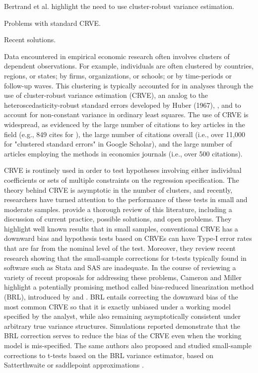 \documentclass[12pt]{article}\usepackage[]{graphicx}\usepackage[]{color}
\begin{document}
Bertrand et al. highlight the need to use cluster-robust variance estimation.

Problems with standard CRVE.

Recent solutions. 

Data encountered in empirical economic research often involves clusters of dependent observations. 
For example, individuals are often clustered by countries, regions, or states; by firms, organizations, or schools; or by time-periods or follow-up waves. 
This clustering is typically accounted for in analyses through the use of cluster-robust variance estimation (CRVE), an analog to the heteroscedasticity-robust standard errors developed by Huber (1967), \citet{eicker1967limit}, and \citet{White1980heteroskedasticity} to account for non-constant variance in ordinary least squares. 
The use of CRVE is widespread, as evidenced by the large number of citations to key articles in the field (e.g., 849 cites for \citet{Wooldridge2003cluster}), 
the large number of citations overall (i.e., over 11,000 for "clustered standard errors" in Google Scholar), and the large number of articles employing the methods in economics journals (i.e., over 500 citations). 

CRVE is routinely used in order to test hypotheses involving either individual coefficients or sets of multiple constraints on the regression specification. 
The theory behind CRVE is asymptotic in the number of clusters, and recently, researchers have turned attention to the performance of these tests in small and moderate samples. 
\citet{Cameron2015practitioners} provide a thorough review of this literature, including a discussion of current practice, possible solutions, and open problems. 
They highlight well known results that in small samples, conventional CRVE has a downward bias and hypothesis tests based on CRVEs can have Type-I error rates that are far from the nominal level of the test.
Moreover, they review recent research showing that the small-sample corrections for t-tests typically found in software such as Stata and SAS are inadequate. 
In the course of reviewing a variety of recent proposals for addressing these problems, Cameron and Miller highlight a potentially promising method called bias-reduced linearization method (BRL), introduced by \citet{McCaffrey2001generalizations} and \citet{Bell2002bias}. 
BRL entails correcting the downward bias of the most common CRVE so that it is exactly unbiased under a working model specified by the analyst, while also remaining asymptotically consistent under arbitrary true variance structures. 
Simulations reported \citet{Bell2002bias} demonstrate that the BRL correction serves to reduce the bias of the CRVE even when the working model is mis-specified. 
The same authors also proposed and studied small-sample corrections to t-tests based on the BRL variance estimator, based on Satterthwaite \citep{Bell2002bias} or saddlepoint approximations \citep{McCaffrey2006improved}.
\end{document}

